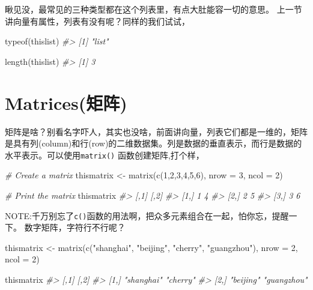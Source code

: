 \documentclass[
]{book}
\newenvironment{Shaded}{\begin{snugshade}}{\end{snugshade}}
\newcommand{\AttributeTok}[1]{\textcolor[rgb]{0.77,0.63,0.00}{#1}}
\newcommand{\CommentTok}[1]{\textcolor[rgb]{0.56,0.35,0.01}{\textit{#1}}}
\newcommand{\DecValTok}[1]{\textcolor[rgb]{0.00,0.00,0.81}{#1}}
\newcommand{\FunctionTok}[1]{\textcolor[rgb]{0.00,0.00,0.00}{#1}}
\newcommand{\NormalTok}[1]{#1}
\newcommand{\OtherTok}[1]{\textcolor[rgb]{0.56,0.35,0.01}{#1}}
\newcommand{\StringTok}[1]{\textcolor[rgb]{0.31,0.60,0.02}{#1}}
\begin{document}
瞅见没，最常见的三种类型都在这个列表里，有点大肚能容一切的意思。
上一节讲向量有属性，列表有没有呢？同样的我们试试，

\begin{Shaded}
\begin{Highlighting}[]
\FunctionTok{typeof}\NormalTok{(thislist)}
\CommentTok{\#\textgreater{} [1] "list"}
\end{Highlighting}
\end{Shaded}

\begin{Shaded}
\begin{Highlighting}[]
\FunctionTok{length}\NormalTok{(thislist)}
\CommentTok{\#\textgreater{} [1] 3}
\end{Highlighting}
\end{Shaded}

\hypertarget{matricesux77e9ux9635}{%
\section{Matrices(矩阵)}\label{matricesux77e9ux9635}}

矩阵是啥？别看名字吓人，其实也没啥，前面讲向量，列表它们都是一维的，矩阵是具有列(column)和行(row)的二维数据集。列是数据的垂直表示，而行是数据的水平表示。可以使用\texttt{matrix()} 函数创建矩阵,打个样，

\begin{Shaded}
\begin{Highlighting}[]
\CommentTok{\# Create a matrix}
\NormalTok{thismatrix }\OtherTok{\textless{}{-}} \FunctionTok{matrix}\NormalTok{(}\FunctionTok{c}\NormalTok{(}\DecValTok{1}\NormalTok{,}\DecValTok{2}\NormalTok{,}\DecValTok{3}\NormalTok{,}\DecValTok{4}\NormalTok{,}\DecValTok{5}\NormalTok{,}\DecValTok{6}\NormalTok{), }\AttributeTok{nrow =} \DecValTok{3}\NormalTok{, }\AttributeTok{ncol =} \DecValTok{2}\NormalTok{)}

\CommentTok{\# Print the matrix}
\NormalTok{thismatrix}
\CommentTok{\#\textgreater{}      [,1] [,2]}
\CommentTok{\#\textgreater{} [1,]    1    4}
\CommentTok{\#\textgreater{} [2,]    2    5}
\CommentTok{\#\textgreater{} [3,]    3    6}
\end{Highlighting}
\end{Shaded}

NOTE:千万别忘了\texttt{c()}函数的用法啊，把众多元素组合在一起，怕你忘，提醒一下。
数字矩阵，字符行不行呢？

\begin{Shaded}
\begin{Highlighting}[]
\NormalTok{thismatrix }\OtherTok{\textless{}{-}} \FunctionTok{matrix}\NormalTok{(}\FunctionTok{c}\NormalTok{(}\StringTok{"shanghai"}\NormalTok{, }\StringTok{"beijing"}\NormalTok{, }\StringTok{"cherry"}\NormalTok{, }\StringTok{"guangzhou"}\NormalTok{), }\AttributeTok{nrow =} \DecValTok{2}\NormalTok{, }\AttributeTok{ncol =} \DecValTok{2}\NormalTok{)}

\NormalTok{thismatrix}
\CommentTok{\#\textgreater{}      [,1]       [,2]       }
\CommentTok{\#\textgreater{} [1,] "shanghai" "cherry"   }
\CommentTok{\#\textgreater{} [2,] "beijing"  "guangzhou"}
\end{Highlighting}
\end{Shaded}
\end{document}
